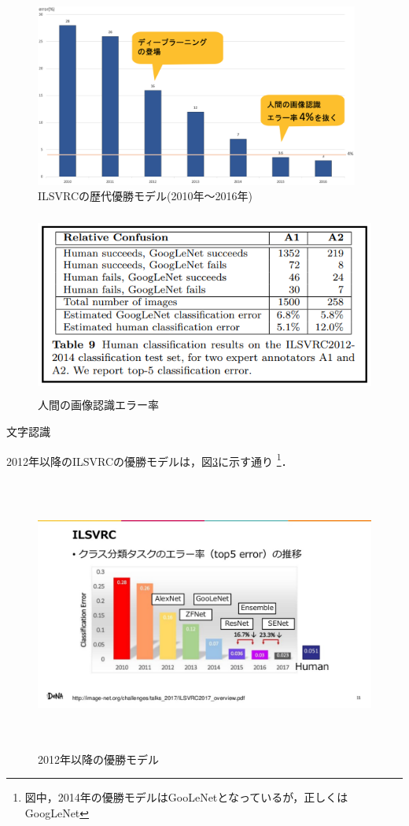 \begin{figure} [H]
	\begin{center}
		\includegraphics[clip, height=6cm, bb=0 0 1976 1112]{data/figure/ilsvrc_winner_2010-2016.png}
		\caption{ILSVRCの歴代優勝モデル(2010年～2016年)}
		\label{ilsvrc_winner_2010-2016}
	\end{center}
\end{figure}

\begin{figure} [H]
	\begin{center}
		\includegraphics[clip, height=6cm, bb=-120 0 568 278]{data/figure/ilsvrc_human_classification_results.png}
		\caption{人間の画像認識エラー率}
		\label{ilsvrc_human_classification_results}
	\end{center}
\end{figure}文字認識

2012年以降のILSVRCの優勝モデルは，図\ref{ilsvrc_winner_2010-2017_with_algo}に示す通り \cite{dl_hist6} \footnote{図中，2014年の優勝モデルはGooLeNetとなっているが，正しくはGoogLeNet}．

\begin{figure} [H]
	\begin{center}
		\includegraphics[clip, height=9cm, bb=-200 0 1920 1080]{data/figure/ilsvrc_winner_2010-2017_with_algo.png}
		\caption{2012年以降の優勝モデル}
		\label{ilsvrc_winner_2010-2017_with_algo}
	\end{center}
\end{figure}
